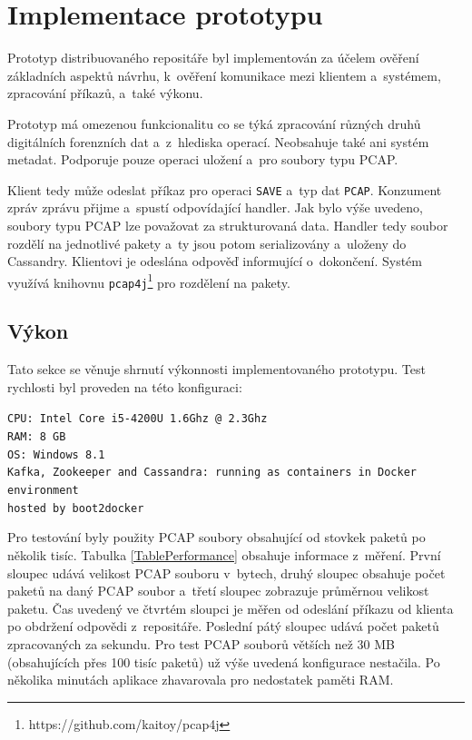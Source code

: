 \chapter{Implementace prototypu} \label{chapterPrototype}
Prototyp distribuovaného repositáře byl implementován za účelem ověření základních aspektů návrhu, k~ověření komunikace mezi klientem a~systémem, zpracování příkazů, a~také výkonu.

Prototyp má omezenou funkcionalitu co se týká zpracování různých druhů digitálních forenzních dat a~z~hlediska operací. Neobsahuje také ani systém metadat. Podporuje pouze operaci uložení a~pro soubory typu PCAP.

Klient tedy může odeslat příkaz pro operaci \texttt{SAVE} a~typ dat \texttt{PCAP}. Konzument zpráv zprávu přijme a~spustí odpovídající handler. Jak bylo výše uvedeno, soubory typu PCAP lze považovat za strukturovaná data. Handler tedy soubor rozdělí na jednotlivé pakety a~ty jsou potom serializovány a~uloženy do Cassandry. Klientovi je odeslána odpověď informující o~dokončení. Systém využívá knihovnu \texttt{pcap4j}\footnote{https://github.com/kaitoy/pcap4j} pro rozdělení na pakety.

\section{Výkon}
Tato sekce se věnuje shrnutí výkonnosti implementovaného prototypu. Test rychlosti byl proveden na této konfiguraci:

\vspace{0.5cm}
\noindent
\texttt{CPU: Intel Core i5-4200U 1.6Ghz @ 2.3Ghz} \\
\texttt{RAM: 8 GB} \\
\texttt{OS: Windows 8.1} \\
\texttt{Kafka, Zookeeper and Cassandra: running as containers in Docker environment} \\
\texttt{hosted by boot2docker}

\vspace{0.5cm}
\noindent
Pro testování byly použity PCAP soubory obsahující od stovkek paketů po několik tisíc. Tabulka \ref{TablePerformance} obsahuje informace z~měření. První sloupec udává velikost PCAP souboru v~bytech, druhý sloupec obsahuje počet paketů na daný PCAP soubor a~třetí sloupec zobrazuje průměrnou velikost paketu. Čas uvedený ve čtvrtém sloupci je měřen od odeslání příkazu od klienta po obdržení odpovědi z~repositáře. Poslední pátý sloupec udává počet paketů zpracovaných za sekundu. Pro test PCAP souborů větších než 30 MB (obsahujících přes 100 tisíc paketů) už výše uvedená konfigurace nestačila. Po několika minutách aplikace zhavarovala pro nedostatek paměti RAM.

